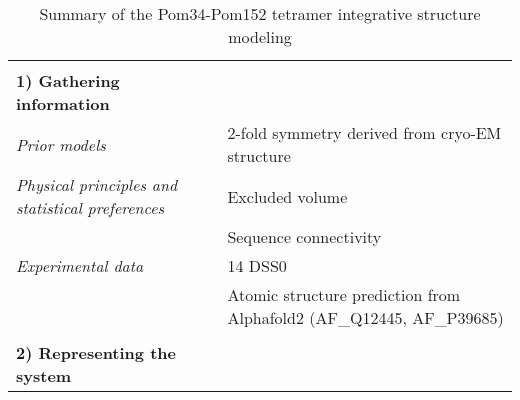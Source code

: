 \documentclass[11pt,a4paper]{article}
\begin{document}
\setcounter{table}{8}

\begin{landscape}
\begin{longtable}{ p{} | p{} } 
\caption{Summary of the Pom34-Pom152 tetramer integrative structure modeling}
  
  &  \\
  \textbf{1) Gathering information} & \\
    \hline

            \textit{Prior models} & 2-fold symmetry derived from cryo-EM structure\\
                \textit{Physical principles and statistical preferences} & Excluded volume\\
            & Sequence connectivity \\
                \textit{Experimental data} & 14 DSS0\\
            & Atomic structure prediction from Alphafold2 (AF\_Q12445, AF\_P39685) \\
          
    &  \\
    \normalsize{\textbf{2) Representing the system}} & \\
    \hline
    

\end{longtable}
\end{landscape}
\end{document}
